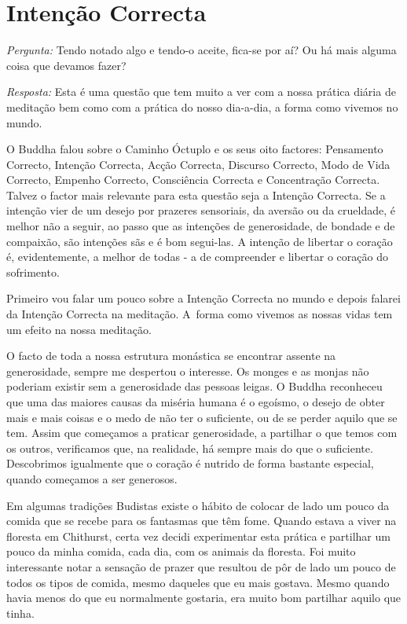 \chapter{Intenção Correcta}

\emph{Pergunta:} Tendo notado algo e tendo-o aceite, fica-se por aí?
Ou há mais alguma coisa que devamos fazer?

\emph{Resposta:} Esta é uma questão que tem muito a ver com a nossa
prática diária de meditação bem como com a prática do nosso dia-a-dia, a
forma como vivemos no mundo.

O Buddha falou sobre o Caminho Óctuplo e os seus oito factores:
Pensamento Correcto, Intenção Correcta, Acção Correcta, Discurso
Correcto, Modo de Vida Correcto, Empenho Correcto, Consciência Correcta
e Concentração Correcta. Talvez o factor mais relevante para esta
questão seja a Intenção Correcta. Se a intenção vier de um desejo por
prazeres sensoriais, da aversão ou da crueldade, é melhor não a seguir,
ao passo que as intenções de generosidade, de bondade e de compaixão,
são intenções sãs e é bom segui-las. A intenção de libertar o coração é,
evidentemente, a melhor de todas - a de compreender e libertar o coração
do sofrimento.

Primeiro vou falar um pouco sobre a Intenção Correcta no mundo e depois
falarei da Intenção Correcta na meditação. A~forma como vivemos as
nossas vidas tem um efeito na nossa meditação.

O facto de toda a nossa estrutura monástica se encontrar assente na
generosidade, sempre me despertou o interesse. Os monges e as monjas não
poderiam existir sem a generosidade das pessoas leigas. O Buddha
reconheceu que uma das maiores causas da miséria humana é o egoísmo, o
desejo de obter mais e mais coisas e o medo de não ter o suficiente, ou
de se perder aquilo que se tem. Assim que começamos a praticar
generosidade, a partilhar o que temos com os outros, verificamos que, na
realidade, há sempre mais do que o suficiente. Descobrimos igualmente
que o coração é nutrido de forma bastante especial, quando começamos a
ser generosos.

Em algumas tradições Budistas existe o hábito de colocar de lado um
pouco da comida que se recebe para os fantasmas que têm fome. Quando
estava a viver na floresta em Chithurst, certa vez decidi experimentar
esta prática e partilhar um pouco da minha comida, cada dia, com os
animais da floresta. Foi muito interessante notar a sensação de prazer
que resultou de pôr de lado um pouco de todos os tipos de comida, mesmo
daqueles que eu mais gostava. Mesmo quando havia menos do que eu
normalmente gostaria, era muito bom partilhar aquilo que tinha.

